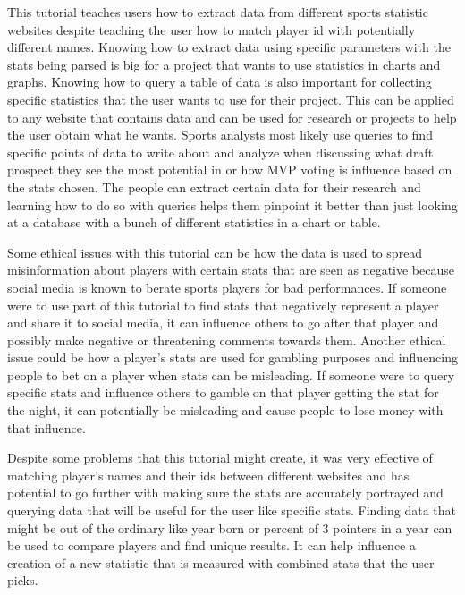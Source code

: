 \documentclass[10pt,twocolumn]{article}
\begin{document}
This tutorial teaches users how to extract data from different sports statistic websites despite teaching the user how to match player id with potentially different names. Knowing how to extract data using specific parameters with the stats being parsed is big for a project that wants to use statistics in charts and graphs. Knowing how to query a table of data is also important for collecting specific statistics that the user wants to use for their project. This can be applied to any website that contains data and can be used for research or projects to help the user obtain what he wants. Sports analysts most likely use queries to find specific points of data to write about and analyze when discussing what draft prospect they see the most potential in or how MVP voting is influence based on the stats chosen. The people can extract certain data for their research and learning how to do so with queries helps them pinpoint it better than just looking at a database with a bunch of different statistics in a chart or table. 

Some ethical issues with this tutorial can be how the data is used to spread misinformation about players with certain stats that are seen as negative because social media is known to berate sports players for bad performances. If someone were to use part of this tutorial to find stats that negatively represent a player and share it to social media, it can influence others to go after that player and possibly make negative or threatening comments towards them. Another ethical issue could be how a player's stats are used for gambling purposes and influencing people to bet on a player when stats can be misleading. If someone were to query specific stats and influence others to gamble on that player getting the stat for the night, it can potentially be misleading and cause people to lose money with that influence. 

Despite some problems that this tutorial might create, it was very effective of matching player's names and their ids between different websites and has potential to go further with making sure the stats are accurately portrayed and querying data that will be useful for the user like specific stats. Finding data that might be out of the ordinary like year born or percent of 3 pointers in a year can be used to compare players and find unique results. It can help influence a creation of a new statistic that is measured with combined stats that the user picks. 

\printbibliography 
\end{document}
